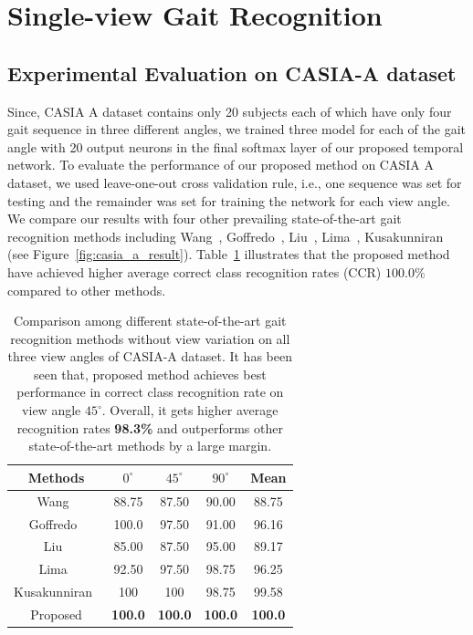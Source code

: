 \section{Single-view Gait Recognition}
\subsection{Experimental Evaluation on CASIA-A dataset}
Since, CASIA A dataset contains only 20 subjects each of which have only four gait sequence in three different angles, we trained three model for each of the gait angle with 20 output neurons in the final softmax layer of our proposed temporal network. To evaluate the performance of our proposed method on CASIA A dataset, we used leave-one-out cross validation rule, i.e., one sequence was set for testing and the remainder was set for training the network for each view angle. We compare our results with four other prevailing state-of-the-art gait recognition methods including Wang~\cite{Wang_03}, Goffredo~\cite{Goffredo_08}, Liu~\cite{Liu_16}, Lima~\cite{Lima_19}, Kusakunniran~\cite{Kusakunniran_09} (see Figure~\ref{fig:casia_a_result}). Table~\ref{table:casia_a_result} illustrates that the proposed method have achieved higher average correct class recognition rates (CCR) $100.0\%$ compared to other methods.


\begin{table}
	\centering
	\caption{Comparison among different state-of-the-art gait recognition methods without view variation on all three view angles of CASIA-A dataset. It has been seen that, proposed method achieves best performance in correct class recognition rate on view angle ${45^{\circ}}$. Overall, it gets higher average recognition rates \textbf{98.3\%} and outperforms other state-of-the-art methods by a large margin. \label{table:casia_a_result}}
	{\begin{tabular*}{30pc}{@{\extracolsep{\fill}}ccccc}\hline
			
			Methods &${0^{\circ}}$ &${45^{\circ}}$   &${90^{\circ}}$  &Mean\\
			\hline
			
			Wang~\cite{Wang_03} &88.75 &87.50 &90.00 &88.75\\
			
			\noalign{\smallskip}
			Goffredo~\cite{Goffredo} &100.0 &97.50 &91.00 &96.16\\ 
			
			\noalign{\smallskip}
			Liu~\cite{Liu02} &85.00 &87.50 &95.00 &89.17\\ 
			
			\noalign{\smallskip}
			Lima~\cite{Lima_19} &92.50 &97.50 &98.75 &96.25 \\
			
			\noalign{\smallskip}
			Kusakunniran~\cite{Kusakunniran_09} &100  &100  &98.75 &99.58 \\
			
			\noalign{\smallskip}
			Proposed &{\textbf{100.0}} & {\textbf{100.0}} &{\textbf{100.0}} & {\textbf{100.0}}\\
			\hline
	\end{tabular*}}{}
\end{table}

